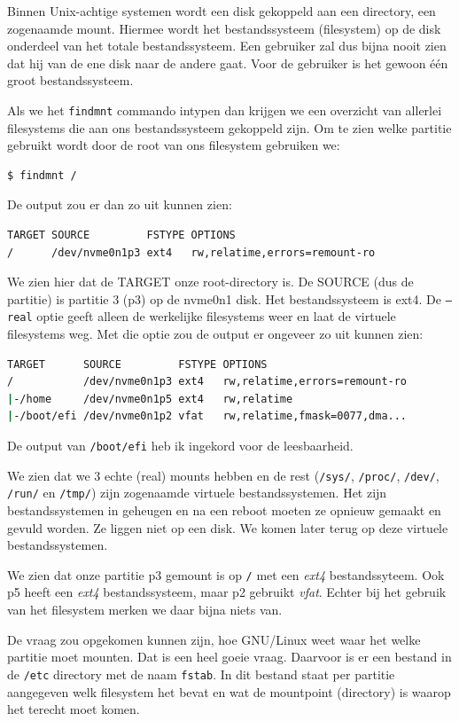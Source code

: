 Binnen Unix-achtige systemen wordt een disk gekoppeld aan een directory, een zogenaamde mount. Hiermee wordt het bestandssysteem (filesystem) op de disk onderdeel van het totale bestandssysteem. Een gebruiker zal dus bijna nooit zien dat hij van de ene disk naar de andere gaat. Voor de gebruiker is het gewoon \'e\'en groot bestandssysteem.

Als we het \texttt{findmnt} commando intypen dan krijgen we een overzicht van allerlei filesystems die aan ons bestandssysteem gekoppeld zijn. Om te zien welke partitie gebruikt wordt door de root van ons filesystem gebruiken we:
\begin{lstlisting}[language=bash]
$ findmnt /
\end{lstlisting}
De output zou er dan zo uit kunnen zien:
\begin{lstlisting}[language=bash]
TARGET SOURCE         FSTYPE OPTIONS
/      /dev/nvme0n1p3 ext4   rw,relatime,errors=remount-ro
\end{lstlisting}

We zien hier dat de TARGET onze root-directory is. De SOURCE (dus de partitie) is partitie 3 (p3) op de nvme0n1 disk. Het bestandssysteem is ext4. De \texttt{--real} optie geeft alleen de werkelijke filesystems weer en laat de virtuele filesystems weg. Met die optie zou de output er ongeveer zo uit kunnen zien:
\begin{lstlisting}[language=bash]
TARGET      SOURCE         FSTYPE OPTIONS
/           /dev/nvme0n1p3 ext4   rw,relatime,errors=remount-ro
|-/home     /dev/nvme0n1p5 ext4   rw,relatime
|-/boot/efi /dev/nvme0n1p2 vfat   rw,relatime,fmask=0077,dma...
\end{lstlisting}

De output van \texttt{/boot/efi} heb ik ingekord voor de leesbaarheid.

We zien dat we 3 echte (real) mounts hebben en de rest (\texttt{/sys/}, \texttt{/proc/}, \texttt{/dev/}, \texttt{/run/} en \texttt{/tmp/}) zijn zogenaamde virtuele bestandssystemen. Het zijn bestandssystemen in geheugen en na een reboot moeten ze opnieuw gemaakt en gevuld worden. Ze liggen niet op een disk. We komen later terug op deze virtuele bestandssystemen.

We zien dat onze partitie p3 gemount is op \texttt{/} met een \textit{ext4} bestandssyteem. Ook p5 heeft een \textit{ext4} bestandssysteem, maar p2 gebruikt \textit{vfat}. Echter bij het gebruik van het filesystem merken we daar bijna niets van.

De vraag zou opgekomen kunnen zijn, hoe GNU/Linux weet waar het welke partitie moet mounten. Dat is een heel goeie vraag. Daarvoor is er een bestand in de \texttt{/etc} directory met de naam \texttt{fstab}. In dit bestand staat per partitie aangegeven welk filesystem het bevat en wat de mountpoint (directory) is waarop het terecht moet komen.

